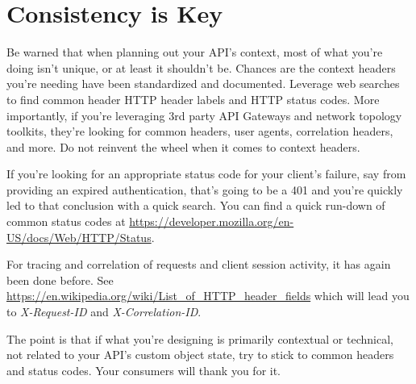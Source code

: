 \section{Consistency is Key}

Be warned that when planning out your API's context, most of what you're doing isn't unique, or at least it shouldn't be. Chances are the context headers you're needing have been standardized and documented.  Leverage web searches to find common header HTTP header labels and HTTP status codes.  More importantly, if you're leveraging 3rd party API Gateways and network topology toolkits, they're looking for common headers, user agents, correlation headers, and more.  Do not reinvent the wheel when it comes to context headers.  

If you're looking for an appropriate status code for your client's failure, say from providing an expired authentication, that's going to be a 401 and you're quickly led to that conclusion with a quick search.  You can find a quick run-down of common status codes at \url{https://developer.mozilla.org/en-US/docs/Web/HTTP/Status}.

For tracing and correlation of requests and client session activity, it has again been done before.  See \url{https://en.wikipedia.org/wiki/List_of_HTTP_header_fields} which will lead you to \textit{X-Request-ID} and \textit{X-Correlation-ID}.

The point is that if what you're designing is primarily contextual or technical, not related to your API's custom object state, try to stick to common headers and status codes.  Your consumers will thank you for it.
